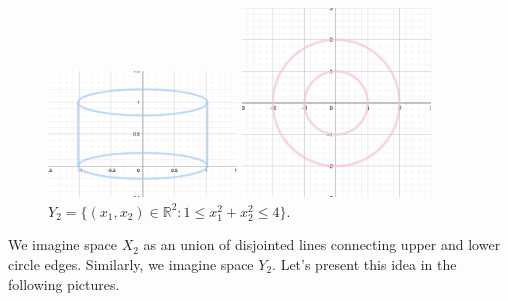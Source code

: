 \documentclass[a4paper,11pt]{article}
\begin{document}
\begin{figure}[ht!]
     \begin{minipage}{0.45\textwidth}
         \centering
         \includegraphics[width=50mm]{X_n2.png}
         \caption{$X_2 = S^1 \times [0,1] \subset \mathbb{R}^3$.}
       \end{minipage}\hfill
     \begin{minipage}{0.55\textwidth}
         \centering
         \includegraphics[width=50mm]{Y_n2.png}
         \caption{$ Y_2 = \{ (x_1, x_2) \in \mathbb{R}^2 : 1 \leq x_1^2 + x_2^2 \leq 4 \}$.}
       \end{minipage}\hfill
    \end{figure}

\newpage
\noindent
We imagine space $X_2$ as an union of disjointed lines connecting upper and lower circle edges. Similarly, we imagine space $Y_2$. Let's present this idea in the following pictures.
\end{document}
